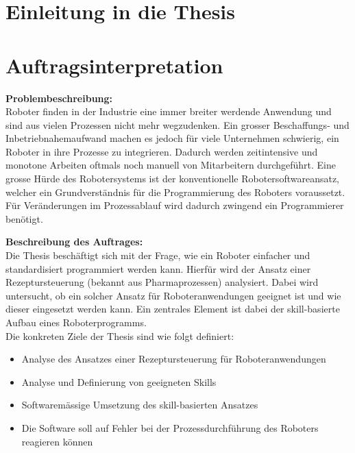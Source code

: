 \section{Einleitung in die Thesis} \label{Einleitung in die Thesis}
	
\newpage
\section{Auftragsinterpretation} \label{Auftragsinterpretation}

	\textbf{Problembeschreibung:} \vspace{2mm} 
	\\
	Roboter finden in der Industrie eine immer breiter werdende Anwendung und sind aus vielen Prozessen
	nicht mehr wegzudenken. Ein grosser Beschaffungs- und Inbetriebnahemaufwand machen es jedoch
	für viele Unternehmen schwierig, ein Roboter in ihre Prozesse zu integrieren. Dadurch werden
	zeitintensive und monotone Arbeiten oftmals noch manuell von Mitarbeitern durchgeführt. Eine grosse
	Hürde des Robotersystems ist der konventionelle Robotersoftwareansatz, welcher ein Grundverständnis
	für die Programmierung des Roboters voraussetzt. Für Veränderungen im Prozessablauf wird dadurch
	zwingend ein Programmierer benötigt.
	\vspace{3mm}
	
	\textbf{Beschreibung des Auftrages:} \vspace{2mm} 
	\\
	Die Thesis beschäftigt sich mit der Frage, wie ein Roboter einfacher und standardisiert programmiert
	werden kann. Hierfür wird der Ansatz einer Rezeptursteuerung (bekannt aus Pharmaprozessen)
	analysiert. Dabei wird untersucht, ob ein solcher Ansatz für Roboteranwendungen geeignet ist und wie
	dieser eingesetzt werden kann. Ein zentrales Element ist dabei der skill-basierte Aufbau eines
	Roboterprogramms.
	\\
	\linebreak
	Die konkreten Ziele der Thesis sind wie folgt definiert:
	\begin{itemize}
		\item Analyse des Ansatzes einer Rezeptursteuerung für Roboteranwendungen
		\item Analyse und Definierung von geeigneten Skills
		\item Softwaremässige Umsetzung des skill-basierten Ansatzes
		\item Die Software soll auf Fehler bei der Prozessdurchführung des Roboters reagieren können
	\end{itemize}
	\addvspace{5mm}
	
